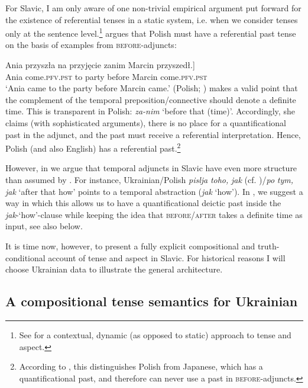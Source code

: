 \documentclass[output=paper,colorlinks,citecolor=brown]{langscibook}
\begin{document}
For Slavic, I am only aware of one non-trivial empirical argument put forward for the existence of referential tenses in a static system, i.e. when we consider tenses only at the sentence level.\footnote{See \citet{Groenn2015} for a contextual, dynamic (as opposed to static) approach to tense and aspect.} \citet{sharvit13} argues that Polish must have a referential past tense on the basis of examples from \textsc{before}-adjuncts: 

\ea\label{pol-bef}\gll
Ania przyszła na przyjęcie \minsp{[} zanim Marcin przyszedł.]\\
Ania come.\textsc{pfv.pst} to party {} before Marcin come.\textsc{pfv.pst}\\
\glt `Ania came to the party before Marcin came.' \hfill (Polish; \cite[2]{sharvit13})
\z
\citet{sharvit13} makes a valid point that the complement of the temporal preposition/connective should denote a definite time. This is transparent in Polish: \textit{za-nim} `before that (time)'. Accordingly, she claims (with sophisticated arguments), there is no  place for a quantificational past in the adjunct, and the past must receive a referential interpretation. Hence, Polish (and also English) has a referential past.\footnote{According to \citet{sharvit13}, this distinguishes Polish from Japanese, which has a quantificational past, and therefore can never use a past in \textsc{before}-adjuncts.}

However, in \citet{gronn_stechow2012} we argue that temporal adjuncts in Slavic have even more structure than assumed by \citet{sharvit13}. For instance, Ukrainian/Polish \textit{pislja} \textit{toho,} \textit{jak} (cf. )/\textit{po} \textit{tym,} \textit{jak} `after that how' points to a temporal abstraction (\textit{jak} `how'). In \citet{gronn_stechow2012}, we suggest a way in which this allows us to have a quantificational deictic past inside the \textit{jak}-`how'-clause while keeping the idea that \textsc{before/after} takes a definite time as input, see also  below.

It is time now, however, to present a fully explicit compositional and truth-conditional account of tense and aspect in Slavic. For historical reasons I will choose Ukrainian data to illustrate the general architecture.

\subsection{A compositional tense semantics for Ukrainian}\label{sec:2.2}
\end{document}
